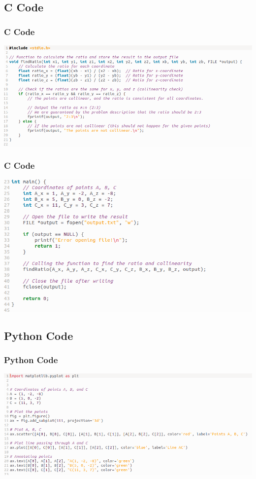 \documentclass{beamer}
\theoremstyle{remark}
\numberwithin{equation}{section}
\begin{document}
\subsection{C Code}
\begin{frame}
\frametitle{C Code}
    \begin{center}
\includegraphics[width=1\textwidth]{figs/figure2.png}
\end{center}
\end{frame}

\begin{frame}
\frametitle{C Code}
    \begin{center}
\includegraphics[width=1\textwidth]{figs/figure3.png}
\end{center}
\end{frame}

\subsection{Python Code}
\begin{frame}
\frametitle{Python Code}
    \begin{center}
\includegraphics[width=1\textwidth]{figs/figure4.png}
\end{center}
\end{frame}
\end{document}

